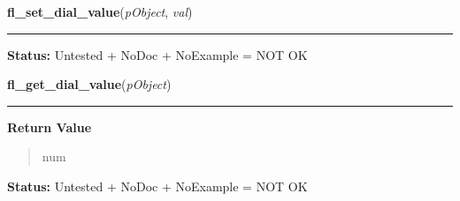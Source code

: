     \label{xformslib:library:fl_set_dial_value}

    \vspace{0.5ex}

\hspace{.8\funcindent}\begin{boxedminipage}{\funcwidth}

    \raggedright \textbf{fl\_set\_dial\_value}(\textit{pObject}, \textit{val})

    \vspace{-1.5ex}

    \rule{\textwidth}{0.5\fboxrule}
\setlength{\parskip}{2ex}
\setlength{\parskip}{1ex}
\textbf{Status:} Untested + NoDoc + NoExample = NOT OK



    \end{boxedminipage}

    \label{xformslib:library:fl_get_dial_value}

    \vspace{0.5ex}

\hspace{.8\funcindent}\begin{boxedminipage}{\funcwidth}

    \raggedright \textbf{fl\_get\_dial\_value}(\textit{pObject})

    \vspace{-1.5ex}

    \rule{\textwidth}{0.5\fboxrule}
\setlength{\parskip}{2ex}
\setlength{\parskip}{1ex}
      \textbf{Return Value}
    \vspace{-1ex}

      \begin{quote}
      num

      \end{quote}

\textbf{Status:} Untested + NoDoc + NoExample = NOT OK



    \end{boxedminipage}

    \label{xformslib:library:fl_set_dial_bounds}

